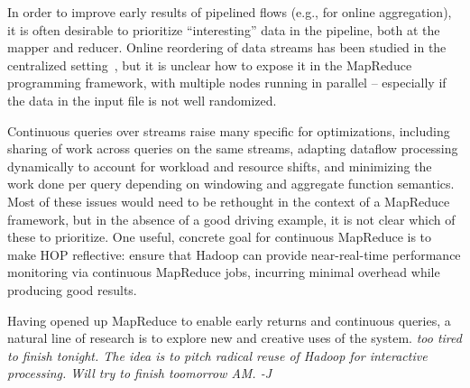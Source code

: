 
In order to improve early results of pipelined flows (e.g., for online aggregation), it is often desirable to prioritize ``interesting'' data in the pipeline, both at the mapper and reducer.  Online reordering of data streams has been studied in the centralized setting~\cite{juggle}, but it is unclear how to expose it in the MapReduce programming framework, with multiple nodes running in parallel -- especially if the data in the input file is not well randomized.  

Continuous queries over streams raise many specific for optimizations, including sharing of work across queries on the same streams, adapting dataflow processing dynamically to account for workload and resource shifts, and minimizing the work done per query depending on windowing and aggregate function semantics.  Most of these issues would need to be rethought in the context of a MapReduce framework, but in the absence of a good driving example, it is not clear which of these to prioritize.
One useful, concrete goal for continuous MapReduce is to make HOP reflective: ensure that Hadoop can provide near-real-time performance monitoring via continuous MapReduce jobs, incurring minimal overhead while producing good results.  

Having opened up MapReduce to enable early returns and continuous queries, a natural line of research is to explore new and creative uses of the system.  
{\em too tired to finish tonight.  The idea is to pitch radical reuse of Hadoop for interactive processing.  Will try to finish toomorrow AM.  -J }